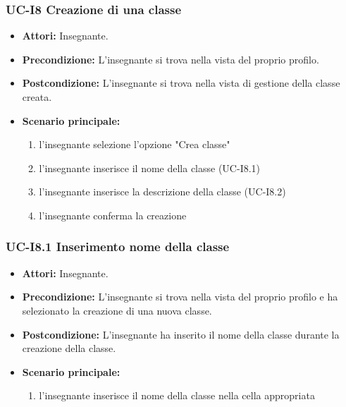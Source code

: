 \subsubsection{UC-I8 Creazione di una classe}
\begin{itemize}
	\item \textbf{Attori:} Insegnante.
	\item \textbf{Precondizione:} L'insegnante si trova nella vista del proprio profilo.
	\item \textbf{Postcondizione:} L'insegnante si trova nella vista di gestione della classe creata.
	\item \textbf{Scenario principale:}
	\begin{enumerate}
		\item l'insegnante selezione l'opzione "Crea classe"
		\item l'insegnante inserisce il nome della classe (UC-I8.1)
		\item l'insegnante inserisce la descrizione della classe (UC-I8.2)
		\item l'insegnante conferma la creazione
	\end{enumerate}
\end{itemize}

\subsubsection{UC-I8.1 Inserimento nome della classe}
\begin{itemize}
	\item \textbf{Attori:} Insegnante.
	\item \textbf{Precondizione:} L'insegnante si trova nella vista del proprio profilo e ha selezionato la creazione di una nuova classe.
	\item \textbf{Postcondizione:} L'insegnante ha inserito il nome della classe durante la creazione della classe.
	\item \textbf{Scenario principale:}
	\begin{enumerate}
		\item l'insegnante inserisce il nome della classe nella cella appropriata
	\end{enumerate}
\end{itemize}


